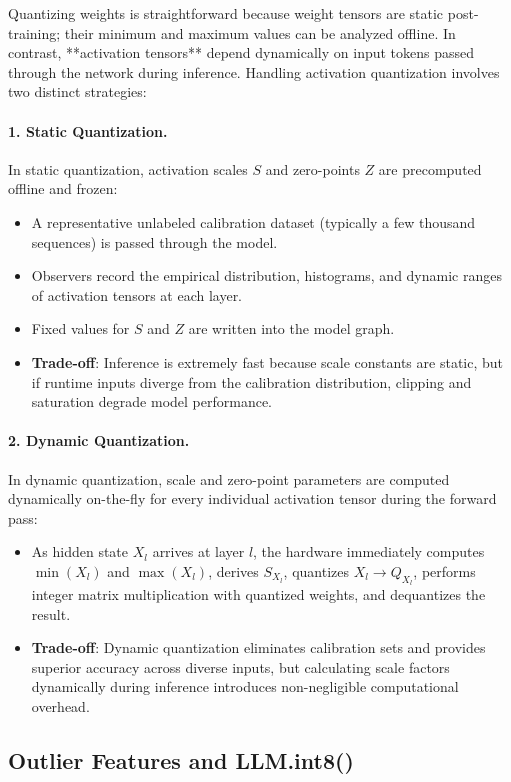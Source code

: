 \documentclass[../../../main.tex]{subfiles}
\begin{document}
Quantizing weights is straightforward because weight tensors are static post-training; their minimum and maximum values can be analyzed offline. In contrast, **activation tensors** depend dynamically on input tokens passed through the network during inference. Handling activation quantization involves two distinct strategies:

\paragraph{1. Static Quantization.}
In static quantization, activation scales $S$ and zero-points $Z$ are precomputed offline and frozen:
\begin{itemize}
    \item A representative unlabeled calibration dataset (typically a few thousand sequences) is passed through the model.
    \item Observers record the empirical distribution, histograms, and dynamic ranges of activation tensors at each layer.
    \item Fixed values for $S$ and $Z$ are written into the model graph.
    \item \textbf{Trade-off}: Inference is extremely fast because scale constants are static, but if runtime inputs diverge from the calibration distribution, clipping and saturation degrade model performance.
\end{itemize}

\paragraph{2. Dynamic Quantization.}
In dynamic quantization, scale and zero-point parameters are computed dynamically on-the-fly for every individual activation tensor during the forward pass:
\begin{itemize}
    \item As hidden state $X_l$ arrives at layer $l$, the hardware immediately computes $\min(X_l)$ and $\max(X_l)$, derives $S_{X_l}$, quantizes $X_l \to Q_{X_l}$, performs integer matrix multiplication with quantized weights, and dequantizes the result.
    \item \textbf{Trade-off}: Dynamic quantization eliminates calibration sets and provides superior accuracy across diverse inputs, but calculating scale factors dynamically during inference introduces non-negligible computational overhead.
\end{itemize}

\subsection{Outlier Features and LLM.int8()}
\label{subsec:llm_int8_outliers}
\end{document}
